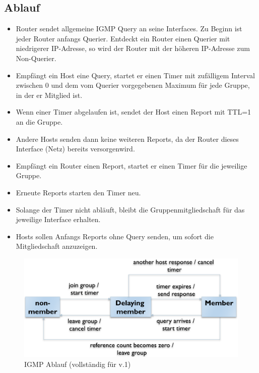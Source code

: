 \documentclass{article} %
\begin{document}
\subsection{Ablauf}
	\begin{itemize}
	\item Router sendet allgemeine IGMP Query an seine Interfaces. Zu Beginn ist jeder Router anfangs Querier. Entdeckt ein Router einen Querier mit niedrigerer IP-Adresse, so wird der Router mit der höheren IP-Adresse zum Non-Querier.
	\item Empfängt ein Host eine Query, startet er einen Timer mit zufälligem Interval zwischen 0 und dem vom Querier vorgegebenen Maximum für jede Gruppe, in der er Mitglied ist. 
	\item Wenn einer Timer abgelaufen ist, sendet der Host einen Report mit TTL=1 an die Gruppe. 
	\item Andere Hosts senden dann keine weiteren Reports, da der Router dieses Interface (Netz) bereits \glqq versorgen\grqq wird.
	\item Empfängt ein Router einen Report, startet er einen Timer für die jeweilige Gruppe. 
	\item Erneute Reports starten den Timer neu. 
	\item Solange der Timer nicht abläuft, bleibt die 	Gruppenmitgliedschaft für das jeweilige Interface erhalten. 
	\item Hosts sollen Anfangs Reports ohne Query senden, um sofort die Mitgliedschaft anzuzeigen. 
	\end{itemize}
 
\begin{figure}[ht]
	\centering
  \includegraphics[width=14cm]{img/igmp.png}
	\caption{IGMP Ablauf (vollständig für v.1)}
\end{figure}
\end{document}
